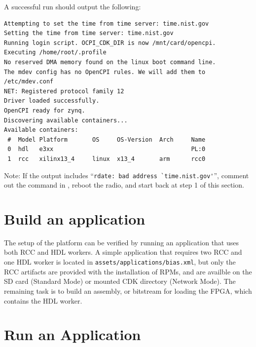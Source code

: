 \begin{enumerate}
\begin{flushleft}
A successful run should output the following:
\begin{verbatim}
Attempting to set the time from time server: time.nist.gov
Setting the time from time server: time.nist.gov
Running login script. OCPI_CDK_DIR is now /mnt/card/opencpi.
Executing /home/root/.profile
No reserved DMA memory found on the linux boot command line.
The mdev config has no OpenCPI rules. We will add them to /etc/mdev.conf
NET: Registered protocol family 12
Driver loaded successfully.
OpenCPI ready for zynq.
Discovering available containers...
Available containers:
 #  Model Platform       OS     OS-Version  Arch     Name
 0  hdl   e3xx                                       PL:0
 1  rcc   xilinx13_4     linux  x13_4       arm      rcc0
\end{verbatim}
Note: If the output includes ``\verb+rdate: bad address `time.nist.gov'+'', comment out the  command in , reboot the radio, and start back at step 1 of this section.
\end{flushleft}
\end{enumerate}

\pagebreak
\section{Build an application}
\begin{flushleft}
The setup of the platform can be verified by running an application that uses both RCC and HDL workers. A simple application that requires two RCC and one HDL worker is located in \texttt{assets/applications/bias.xml}, but only the RCC artifacts are provided with the installation of RPMs, and are availble on the SD card (Standard Mode) or mounted CDK directory (Network Mode). The remaining task is to build an assembly, or bitstream for loading the FPGA, which contains the HDL worker.
\end{flushleft}

\section{Run an Application}
